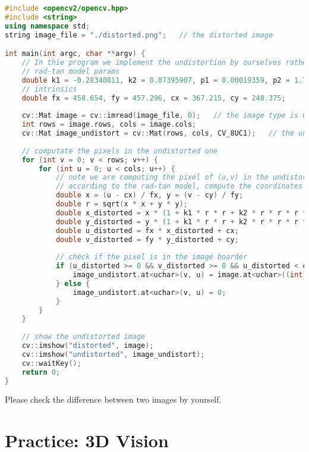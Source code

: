 \begin{lstlisting}[language=C++,caption=slambook/ch5/imageBasics/undistortImage.cpp]
#include <opencv2/opencv.hpp>
#include <string>
using namespace std;
string image_file = "./distorted.png";   // the distorted image 

int main(int argc, char **argv) {
    // In thie program we implement the undistortion by ourselves rather than using opencv
    // rad-tan model params
    double k1 = -0.28340811, k2 = 0.07395907, p1 = 0.00019359, p2 = 1.76187114e-05;
    // intrinsics
    double fx = 458.654, fy = 457.296, cx = 367.215, cy = 248.375;
    
    cv::Mat image = cv::imread(image_file, 0);   // the image type is CV_8UC1
    int rows = image.rows, cols = image.cols;
    cv::Mat image_undistort = cv::Mat(rows, cols, CV_8UC1);   // the undistorted image
    
    // computate the pixels in the undistorted one
    for (int v = 0; v < rows; v++) {
        for (int u = 0; u < cols; u++) {
            // note we are computing the pixel of (u,v) in the undistorted image
            // according to the rad-tan model, compute the coordinates in the distorted image
            double x = (u - cx) / fx, y = (v - cy) / fy;
            double r = sqrt(x * x + y * y);
            double x_distorted = x * (1 + k1 * r * r + k2 * r * r * r * r) + 2 * p1 * x * y + p2 * (r * r + 2 * x * x);
            double y_distorted = y * (1 + k1 * r * r + k2 * r * r * r * r) + p1 * (r * r + 2 * y * y) + 2 * p2 * x * y;
            double u_distorted = fx * x_distorted + cx;
            double v_distorted = fy * y_distorted + cy;
            
            // check if the pixel is in the image boarder
            if (u_distorted >= 0 && v_distorted >= 0 && u_distorted < cols && v_distorted < rows) {
                image_undistort.at<uchar>(v, u) = image.at<uchar>((int) v_distorted, (int) u_distorted);
            } else {
                image_undistort.at<uchar>(v, u) = 0;
            }
        }
    }
    
    // show the undistorted image
    cv::imshow("distorted", image);
    cv::imshow("undistorted", image_undistort);
    cv::waitKey();
    return 0;
}
\end{lstlisting}

Please check the difference between two images by yourself.

\section{Practice: 3D Vision}
